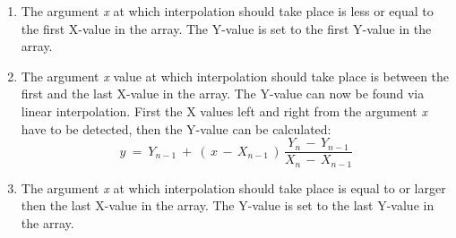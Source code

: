 \begin{enumerate}
\item The argument {\it x} at which interpolation should take place is less or equal to the first
    X-value in the array. The Y-value is set to the first Y-value in the array.
\item The argument {\it x\/} value at which interpolation should take place is between the first
    and the last X-value in the array. The Y-value can now be found via linear
    interpolation. First the X values left and right from the argument {\it x\/} have to be
    detected, then the Y-value can be calculated:\\
    \begin{equation*}
    y~=~ Y _{n-1} ~+~ (\, x\, -\, X _{n-1} \, )\,{\frac{ Y _{n} \, -\, Y _{n-1} }{X _{n} \, -\, X _{n-1} }}
    \end{equation*}
\item The argument {\it x\/} at which interpolation should take place is equal to or larger then the
    last X-value in the array. The Y-value is set to the last Y-value in the array.
\end{enumerate}